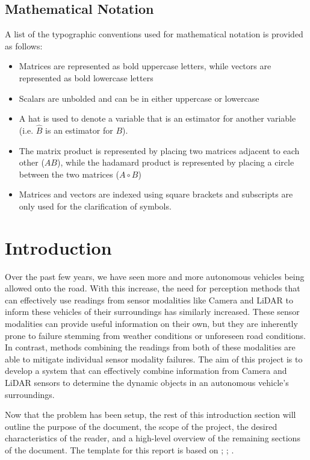 \documentclass[12pt]{article}
\begin{document}
\subsection{Mathematical Notation}
A list of the typographic conventions used for mathematical notation is provided as follows:
\begin{itemize}
  \item Matrices are represented as bold uppercase letters, while vectors are represented as bold lowercase letters
  \item Scalars are unbolded and can be in either uppercase or lowercase
  \item A hat is used to denote a variable that is an estimator for another variable (i.e. $\hat{B}$ is an estimator for $B$).
  \item The matrix product is represented by placing two matrices adjacent to each other ($AB$), while the hadamard product is represented by placing a circle between the two matrices ($A\circ{}B$)
  \item Matrices and vectors are indexed using square brackets and subscripts are only used for the clarification of symbols. 
\end{itemize}

\newpage


\section{Introduction}

Over the past few years, we have seen more and more autonomous vehicles being allowed onto the road. 
With this increase, the need for perception methods that can effectively use readings from sensor 
modalities like Camera and LiDAR to inform these vehicles of their surroundings has similarly increased.
These sensor modalities can provide useful information on their own, but they are inherently prone
to failure stemming from weather conditions or unforeseen road conditions. In contrast, methods combining the 
readings from both of these modalities are able to mitigate individual sensor modality failures. The aim of 
this project is to develop a system that can effectively combine information from Camera and LiDAR sensors
to determine the dynamic objects in an autonomous vehicle's surroundings.

Now that the problem has been setup, the rest of this introduction section will outline the purpose 
of the document, the scope of the project, the desired characteristics of the reader, and a high-level overview
of the remaining sections of the document. The template for this report is based on \cite{SmithAndLai2005}; \cite{SmithEtAl2007}; \cite{SmithAndKoothoor2016}.
\end{document}
